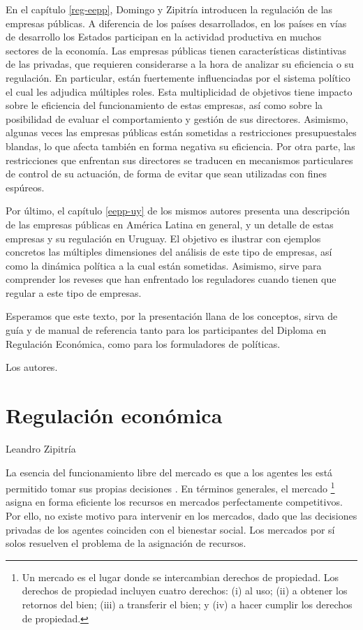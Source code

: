 \documentclass[
  12pt,
  spanish,
]{book}
\begin{document}
En el capítulo \ref{reg-eepp}, Domingo y Zipitría introducen la regulación de las empresas públicas. A diferencia de los países desarrollados, en los países en vías de desarrollo los Estados participan en la actividad productiva en muchos sectores de la economía. Las empresas públicas tienen características distintivas de las privadas, que requieren considerarse a la hora de analizar su eficiencia o su regulación. En particular, están fuertemente influenciadas por el sistema político el cual les adjudica múltiples roles. Esta multiplicidad de objetivos tiene impacto sobre le eficiencia del funcionamiento de estas empresas, así como sobre la posibilidad de evaluar el comportamiento y gestión de sus directores. Asimismo, algunas veces las empresas públicas están sometidas a restricciones presupuestales blandas, lo que afecta también en forma negativa su eficiencia. Por otra parte, las restricciones que enfrentan sus directores se traducen en mecanismos particulares de control de su actuación, de forma de evitar que sean utilizadas con fines espúreos.

Por último, el capítulo \ref{eepp-uy} de los mismos autores presenta una descripción de las empresas públicas en América Latina en general, y un detalle de estas empresas y su regulación en Uruguay. El objetivo es ilustrar con ejemplos concretos las múltiples dimensiones del análisis de este tipo de empresas, así como la dinámica política a la cual están sometidas. Asimismo, sirve para comprender los reveses que han enfrentado los reguladores cuando tienen que regular a este tipo de empresas.

Esperamos que este texto, por la presentación llana de los conceptos, sirva de guía y de manual de referencia tanto para los participantes del Diploma en Regulación Económica, como para los formuladores de políticas.

Los autores.

\hypertarget{reg-ec}{%
\chapter{Regulación económica}\label{reg-ec}}

Leandro Zipitría

La esencia del funcionamiento libre del mercado es que a los agentes les está permitido tomar sus propias decisiones \citep[357]{Viscusi2005}. En términos generales, el mercado
\footnote{Un mercado es el lugar donde se intercambian derechos de propiedad. Los derechos de propiedad incluyen cuatro derechos: (i) al uso; (ii) a obtener los retornos del bien; (iii) a transferir el bien; y (iv) a hacer cumplir los derechos de propiedad.}
asigna en forma eficiente los recursos en mercados perfectamente competitivos. Por ello, no existe motivo para intervenir en los mercados, dado que las decisiones privadas de los agentes coinciden con el bienestar social. Los mercados por sí solos resuelven el problema de la asignación de recursos.
\end{document}
